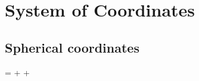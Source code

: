 \documentclass[oneside, 12pt]{book}
\begin{document}
\chapter{System of Coordinates} \edef\SystemCoordinatesChapter{\thechapter}

\section{Spherical coordinates}

\beq[eq:gradspherical] \gradi =  + \vu{\theta}\pdv{\theta} + \vu{\phi}\pdv{\phi} \eeq
\end{document}

